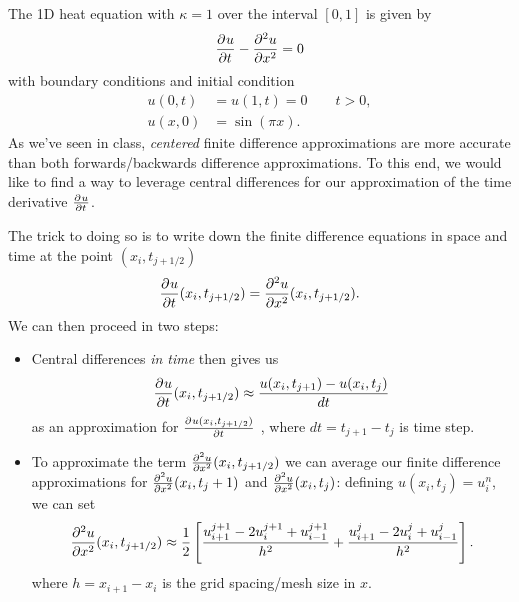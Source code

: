 The 1D heat equation with $\kappa = 1$ over the interval $[0,1]$ is given by
\[
\frac{\partial^{} u}{\partial t^{}}-\frac{\partial^{2} u}{\partial x^{2}} = 0
\]
with boundary conditions and initial condition 
\begin{align*}
u(0,t) &= u(1,t) = 0\qquad t > 0,\\
u(x,0)&=\sin(\pi x).
\end{align*}
As we've seen in class, \emph{centered} finite difference approximations are more accurate than both forwards/backwards difference approximations.   To this end, we would like to find a way to leverage central differences for our approximation of the time derivative $\frac{\partial^{} u}{\partial t^{}}$.  

The trick to doing so is to write down the finite difference equations in space and time at the point $(x_i,t_{j+ 1/2})$
\[
\frac{\partial^{} u}{\partial t^{}}(x_i,t_{j+ 1/2}) = \frac{\partial^{2} u}{\partial x^{2}}(x_i,t_{j+ 1/2}).
\]
We can then proceed in two steps:
\begin{itemize}
\item Central differences \emph{in time} then gives us
\[
\frac{\partial^{} u}{\partial t^{}}(x_i,t_{j+ 1/2})\approx \frac{u(x_i,t_{j+ 1})-u(x_i,t_{j})}{dt}
\] 
as an approximation for $\frac{\partial^{} u(x_i,t_{j+ 1/2})}{\partial t^{}}$ , where $dt = t_{j+1}-t_j$ is time step. 
\vspace{1em}
\item To approximate the term $\frac{\partial^{2} u}{\partial x^{2}}(x_i,t_{j+ 1/2} )$ we can average our finite difference approximations for $\frac{\partial^{2} u}{\partial x^{2}}(x_i,t_j+1)$ and $\frac{\partial^{2} u}{\partial x^{2}}(x_i,t_j)$: defining $u(x_i,t_j)=u_i^n$, we can set
\[
\frac{\partial^{2} u}{\partial x^{2}}(x_i,t_{j+ 1/2} ) \approx \frac{1}{2}\left[\frac{u^{j+1}_{i+1} - 2u_i^{j+1} + u_{i-1}^{j+1}}{h^2} + \frac{u^j_{i+1} - 2u_i^j + u_{i-1}^{j}}{h^2}\right].
\]
where $h = x_{i+1}-x_i$ is the grid spacing/mesh size in $x$.  

\end{itemize}
\vspace{1em}

